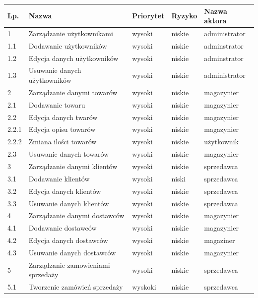 \begin{table}[ht]
	 \begin{center}
	    \begin{tabular}{| l | l | l | l | l |}%
	    	\hline
		    \textbf{Lp.} & \textbf{Nazwa}  & \textbf{Priorytet} & \textbf{Ryzyko} &
		    \textbf{Nazwa aktora} \\
		    \hline
		    1 & Zarządzanie użytkownikami & wysoki & niskie & administrator \\
		    1.1 & Dodawanie użytkowników & wysoki & niskie & adminstrator \\
		    1.2 & Edycja danych użytkowników & wysoki & niskie & adminstrator \\ 	
		    1.3 & Usuwanie danych użytkowników & wysoki &niskie & administrator \\
		    \hline
		    2 & Zarządzanie danymi towarów & wysoki & niskie & magazynier \\
		    2.1 & Dodawanie towaru & wysoki &  niskie & magazynier \\
		    2.2 & Edycja danych twarów & wysoki & niskie & magazynier \\
		    2.2.1 & Edycja opisu towarów & wysoki & niskie & magazynier \\
		    2.2.2 & Zmiana ilości towarów & wysoki & niskie & użytkownik \\
		    2.3 & Usuwanie danych towarów & wysoki & niskie & magazynier \\
		    \hline
		   	3 & Zarządzanie danymi klientów & wysoki & niskie & sprzedawca \\
		   	3.1 & Dodawanie klientów & wysoki & niski & sprzedawca \\
		   	3.2 & Edycja danych klientów & wysoki & niskie & sprzedawca \\
		   	3.3 & Usuwanie danych klientów & wysoki & niskie & sprzedawca \\
		   	\hline
		   	4 & Zarządzanie danymi dostawców & wysoki & niskie & magazynier \\
		   	4.1 & Dodawanie dostawców & wysoki & niskie & magazynier \\
		   	4.2 & Edycja danych dostawców & wysoki & niskie & magaziner \\
		   	4.3 & Usuwanie danych dostawców & wysoki & niskie & magazynier \\
		   	\hline
		   	5 & Zarządzanie zamowieniami sprzedaży & wysoki & niskie & sprzedawca \\
		   	5.1 & Tworzenie zamówień sprzedaży & wyskoki & niskie & sprzedawca \\

\end{tabular}
\end{center}
\end{table}
